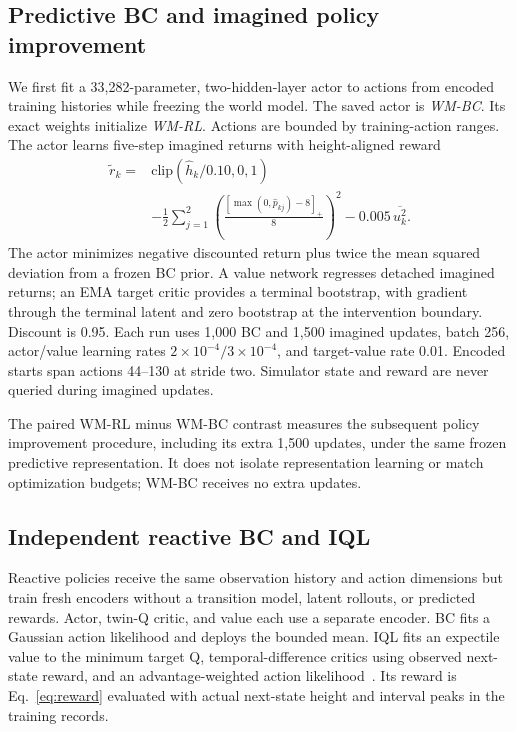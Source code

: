 \documentclass[letterpaper,10pt,conference]{ieeeconf}
\begin{document}
\subsection{Predictive BC and imagined policy improvement}
We first fit a 33,282-parameter, two-hidden-layer actor to actions from
encoded training histories while freezing the world model. The saved
actor is \emph{WM-BC}. Its exact weights initialize \emph{WM-RL}.
Actions are bounded by training-action ranges. The actor learns five-step
imagined returns with height-aligned reward
\begin{equation}
\begin{split}
\widetilde r_k={}&\mathrm{clip}(\widehat h_k/0.10,0,1)\\
&-\frac12\sum_{j=1}^{2}\left(\frac{[\max(0,\widehat p_{kj})-8]_+}{8}\right)^2
-0.005\,\overline{u_k^2}.
\end{split}
\label{eq:reward}
\end{equation}
The actor minimizes negative discounted return plus twice the mean squared
deviation from a frozen BC prior. A value network regresses detached
imagined returns; an EMA target critic provides a terminal bootstrap,
with gradient through the terminal latent and zero bootstrap at the
intervention boundary. Discount is 0.95. Each run uses 1,000 BC and 1,500
imagined updates, batch 256, actor/value learning rates
$2\times10^{-4}/3\times10^{-4}$, and target-value rate 0.01.
Encoded starts span actions 44--130 at stride two. Simulator state and
reward are never queried during imagined updates.

The paired WM-RL minus WM-BC contrast measures the subsequent policy
improvement procedure, including its extra 1,500 updates, under the same
frozen predictive representation. It does not isolate representation
learning or match optimization budgets; WM-BC receives no extra updates.

\subsection{Independent reactive BC and IQL}
Reactive policies receive the same observation history and action dimensions
but train fresh encoders without a transition model, latent rollouts, or
predicted rewards. Actor, twin-Q critic, and value each use a separate
encoder. BC fits a Gaussian action likelihood and deploys the bounded mean.
IQL fits an expectile value to the minimum target Q, temporal-difference
critics using observed next-state reward, and an advantage-weighted action
likelihood~\cite{iql}. Its reward is Eq.~\eqref{eq:reward} evaluated with
actual next-state height and interval peaks in the training records.
\end{document}
